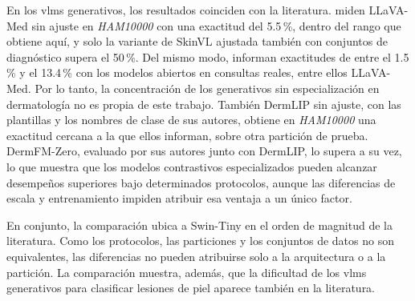 En los \glspl{vlm} generativos, los resultados coinciden con la literatura. \textcite{zeng2025mmskin} miden LLaVA-Med
sin ajuste en \emph{HAM10000} con una exactitud del 5.5\,\%, dentro del rango que obtiene aquí, y solo la variante de
SkinVL ajustada también con conjuntos de diagnóstico supera el 50\,\%. Del mismo modo, \textcite{jiang2026multimodal} informan exactitudes de entre el 1.5\,\% y el 13.4\,\% con los modelos abiertos en
consultas reales, entre ellos LLaVA-Med. Por lo tanto, la concentración de los generativos sin especialización en dermatología no es propia de este trabajo. También DermLIP sin ajuste, con las plantillas y los nombres de clase de sus autores, obtiene en
\emph{HAM10000} una exactitud cercana a la que ellos informan, sobre otra partición de prueba. DermFM-Zero, evaluado
por sus autores junto con DermLIP, lo supera a su vez, lo que muestra que los modelos contrastivos especializados pueden alcanzar desempeños superiores bajo determinados protocolos, aunque las diferencias de escala y entrenamiento impiden atribuir esa ventaja a un único factor.

En conjunto, la comparación ubica a Swin-Tiny en el orden de magnitud de la literatura. Como los protocolos, las
particiones y los conjuntos de datos no son equivalentes, las diferencias no pueden atribuirse solo a la arquitectura o
a la partición. La comparación muestra, además, que la dificultad de los \glspl{vlm} generativos para clasificar lesiones de
piel aparece también en la literatura.
